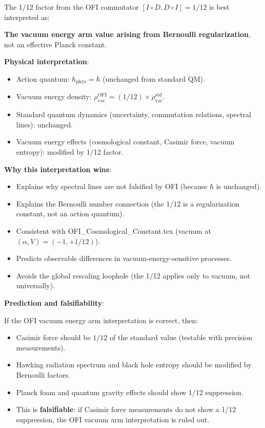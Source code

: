 \documentclass[12pt]{article}
\theoremstyle{definition}
\newcommand{\rhovac}{\rho_{\mathrm{vac}}}
\begin{document}
\begin{tcolorbox}[resultbox, title=Summary: The Physical Interpretation of hbar_OFI = hbar/12]
The 1/12 factor from the OFI commutator $[I\circ D, D\circ I] = 1/12$ is best
interpreted as:

\textbf{The vacuum energy arm value arising from Bernoulli regularization}, not an
effective Planck constant.

\textbf{Physical interpretation}:
\begin{itemize}
  \item Action quantum: $\hbar_{\mathrm{phys}} = \hbar$ (unchanged from standard QM).
  \item Vacuum energy density: $\rhovac^{\mathrm{OFI}} = (1/12) \times \rhovac^{\mathrm{std}}$.
  \item Standard quantum dynamics (uncertainty, commutation relations, spectral lines):
    unchanged.
  \item Vacuum energy effects (cosmological constant, Casimir force, vacuum entropy):
    modified by 1/12 factor.
\end{itemize}

\textbf{Why this interpretation wins}:
\begin{itemize}
  \item Explains why spectral lines are not falsified by OFI (because $\hbar$ is
    unchanged).
  \item Explains the Bernoulli number connection (the 1/12 is a regularization
    constant, not an action quantum).
  \item Consistent with OFI_Cosmological_Constant.tex (vacuum at $(\alpha, V) = (-1, +1/12)$).
  \item Predicts observable differences in vacuum-energy-sensitive processes.
  \item Avoids the global rescaling loophole (the 1/12 applies only to vacuum,
    not universally).
\end{itemize}

\textbf{Prediction and falsifiability}:

If the OFI vacuum energy arm interpretation is correct, then:
\begin{itemize}
  \item Casimir force should be $1/12$ of the standard value (testable with
    precision measurements).
  \item Hawking radiation spectrum and black hole entropy should be modified by
    Bernoulli factors.
  \item Planck foam and quantum gravity effects should show 1/12 suppression.
  \item This is \textbf{falsifiable}: if Casimir force measurements do not show a
    1/12 suppression, the OFI vacuum arm interpretation is ruled out.
\end{itemize}
\end{tcolorbox}
\end{document}

